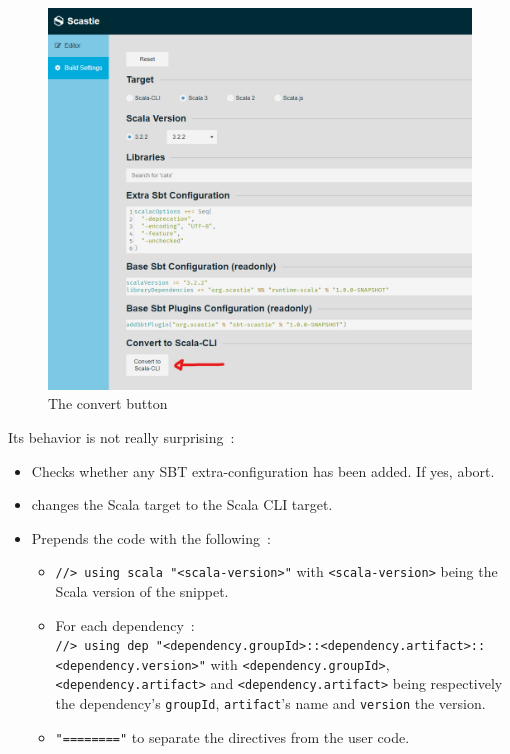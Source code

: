 \documentclass{article}
\begin{document}
\begin{figure}[H]
    \centering
    \includegraphics[width=\linewidth]{./scastie_convert.png}
    \caption{The convert button}
\end{figure}

Its behavior is not really surprising~:

\begin{itemize}
    \item Checks whether any SBT extra-configuration has been added. If yes, abort.
    \item changes the Scala target to the Scala CLI target.
    \item Prepends the code with the following~:
    \begin{itemize}
        \item \lstinline{//> using scala "<scala-version>"} with \lstinline{<scala-version>} being the Scala version of the snippet.
        \item For each dependency~: \\ \lstinline{//> using dep "<dependency.groupId>::<dependency.artifact>::<dependency.version>"} with \lstinline{<dependency.groupId>}, \lstinline{<dependency.artifact>} and \lstinline{<dependency.artifact>} being respectively the dependency's \lstinline{groupId}, \lstinline{artifact}'s name and \lstinline{version} the version.
        \item \lstinline{"========"} to separate the directives from the user code.
    \end{itemize}
\end{itemize}
\end{document}
